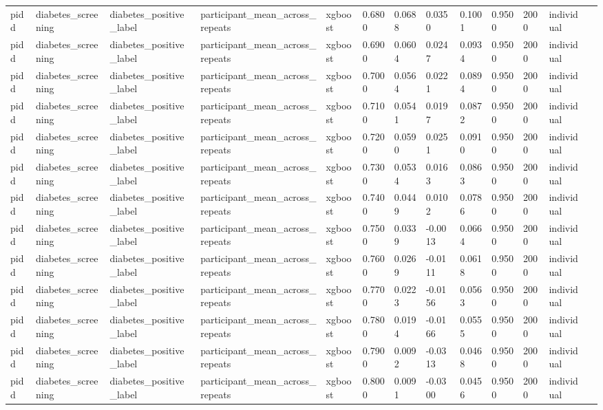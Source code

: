 \begin{tabular}{lllllllllllll}
pidd & diabetes\_screening & diabetes\_positive\_label & participant\_mean\_across\_repeats & xgboost & 0.6800 & 0.0688 & 0.0350 & 0.1001 & 0.9500 & 2000 & individual &  \\
pidd & diabetes\_screening & diabetes\_positive\_label & participant\_mean\_across\_repeats & xgboost & 0.6900 & 0.0604 & 0.0247 & 0.0934 & 0.9500 & 2000 & individual &  \\
pidd & diabetes\_screening & diabetes\_positive\_label & participant\_mean\_across\_repeats & xgboost & 0.7000 & 0.0564 & 0.0221 & 0.0894 & 0.9500 & 2000 & individual &  \\
pidd & diabetes\_screening & diabetes\_positive\_label & participant\_mean\_across\_repeats & xgboost & 0.7100 & 0.0541 & 0.0197 & 0.0872 & 0.9500 & 2000 & individual &  \\
pidd & diabetes\_screening & diabetes\_positive\_label & participant\_mean\_across\_repeats & xgboost & 0.7200 & 0.0590 & 0.0251 & 0.0910 & 0.9500 & 2000 & individual &  \\
pidd & diabetes\_screening & diabetes\_positive\_label & participant\_mean\_across\_repeats & xgboost & 0.7300 & 0.0534 & 0.0163 & 0.0863 & 0.9500 & 2000 & individual &  \\
pidd & diabetes\_screening & diabetes\_positive\_label & participant\_mean\_across\_repeats & xgboost & 0.7400 & 0.0449 & 0.0102 & 0.0786 & 0.9500 & 2000 & individual &  \\
pidd & diabetes\_screening & diabetes\_positive\_label & participant\_mean\_across\_repeats & xgboost & 0.7500 & 0.0339 & -0.0013 & 0.0664 & 0.9500 & 2000 & individual &  \\
pidd & diabetes\_screening & diabetes\_positive\_label & participant\_mean\_across\_repeats & xgboost & 0.7600 & 0.0269 & -0.0111 & 0.0618 & 0.9500 & 2000 & individual &  \\
pidd & diabetes\_screening & diabetes\_positive\_label & participant\_mean\_across\_repeats & xgboost & 0.7700 & 0.0223 & -0.0156 & 0.0563 & 0.9500 & 2000 & individual &  \\
pidd & diabetes\_screening & diabetes\_positive\_label & participant\_mean\_across\_repeats & xgboost & 0.7800 & 0.0194 & -0.0166 & 0.0555 & 0.9500 & 2000 & individual &  \\
pidd & diabetes\_screening & diabetes\_positive\_label & participant\_mean\_across\_repeats & xgboost & 0.7900 & 0.0092 & -0.0313 & 0.0468 & 0.9500 & 2000 & individual &  \\
pidd & diabetes\_screening & diabetes\_positive\_label & participant\_mean\_across\_repeats & xgboost & 0.8000 & 0.0091 & -0.0300 & 0.0456 & 0.9500 & 2000 & individual &  \\

\end{tabular}
